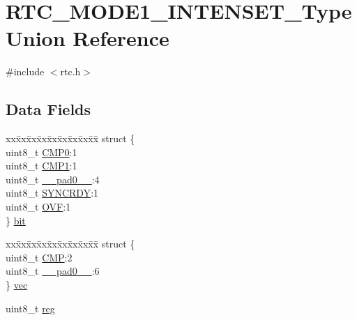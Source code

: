 \hypertarget{union_r_t_c___m_o_d_e1___i_n_t_e_n_s_e_t___type}{}\section{R\+T\+C\+\_\+\+M\+O\+D\+E1\+\_\+\+I\+N\+T\+E\+N\+S\+E\+T\+\_\+\+Type Union Reference}
\label{union_r_t_c___m_o_d_e1___i_n_t_e_n_s_e_t___type}


{\ttfamily \#include $<$rtc.\+h$>$}

\subsection*{Data Fields}
\begin{DoxyCompactItemize}
\item 
\begin{tabbing}
xx\=xx\=xx\=xx\=xx\=xx\=xx\=xx\=xx\=\kill
struct \{\\
\>uint8\_t \mbox{\hyperlink{union_r_t_c___m_o_d_e1___i_n_t_e_n_s_e_t___type_adc7d4e5f43b2e44a828fdfc89f126899}{CMP0}}:1\\
\>uint8\_t \mbox{\hyperlink{union_r_t_c___m_o_d_e1___i_n_t_e_n_s_e_t___type_af3bf2ba7b194836fad69c7dcac0bc7bb}{CMP1}}:1\\
\>uint8\_t \mbox{\hyperlink{union_r_t_c___m_o_d_e1___i_n_t_e_n_s_e_t___type_a8b4eebe79ded0459acec2f4950102ba3}{\_\_pad0\_\_}}:4\\
\>uint8\_t \mbox{\hyperlink{union_r_t_c___m_o_d_e1___i_n_t_e_n_s_e_t___type_aece75e176e4fd55bf68937f1b56bde63}{SYNCRDY}}:1\\
\>uint8\_t \mbox{\hyperlink{union_r_t_c___m_o_d_e1___i_n_t_e_n_s_e_t___type_ac6a3a2f132415ccc7b2b360497b74b15}{OVF}}:1\\
\} \mbox{\hyperlink{union_r_t_c___m_o_d_e1___i_n_t_e_n_s_e_t___type_ae69dd4c6929cf2804b335c267246158f}{bit}}\\

\end{tabbing}\item 
\begin{tabbing}
xx\=xx\=xx\=xx\=xx\=xx\=xx\=xx\=xx\=\kill
struct \{\\
\>uint8\_t \mbox{\hyperlink{union_r_t_c___m_o_d_e1___i_n_t_e_n_s_e_t___type_ac5a98d851fe96017f1c4624476deb57a}{CMP}}:2\\
\>uint8\_t \mbox{\hyperlink{union_r_t_c___m_o_d_e1___i_n_t_e_n_s_e_t___type_a8b4eebe79ded0459acec2f4950102ba3}{\_\_pad0\_\_}}:6\\
\} \mbox{\hyperlink{union_r_t_c___m_o_d_e1___i_n_t_e_n_s_e_t___type_a20ad956f76dddcf62ec972c34a8ff8ea}{vec}}\\

\end{tabbing}\item 
uint8\+\_\+t \mbox{\hyperlink{union_r_t_c___m_o_d_e1___i_n_t_e_n_s_e_t___type_a9428adc9af4653a2050e2536b55dec8d}{reg}}
\end{DoxyCompactItemize}


